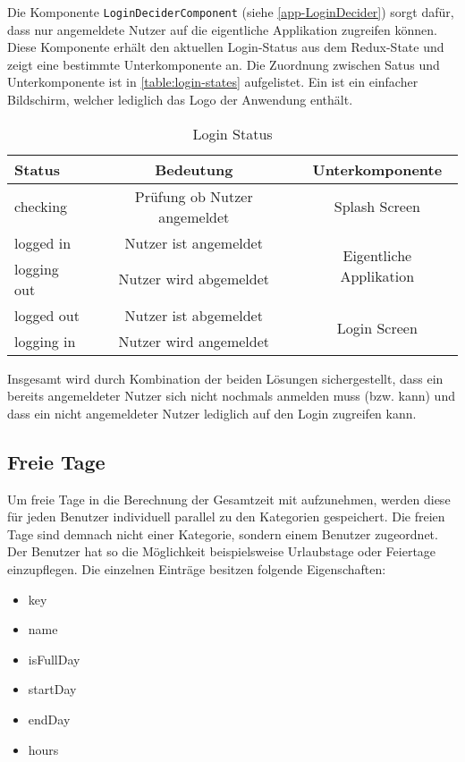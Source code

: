 

Die Komponente \texttt{LoginDeciderComponent} (siehe \autoref{app-LoginDecider}) sorgt dafür,
dass nur angemeldete Nutzer auf die eigentliche Applikation zugreifen können.
Diese Komponente erhält den aktuellen Login-Status aus dem Redux-State und zeigt eine bestimmte Unterkomponente an.
Die Zuordnung zwischen Satus und Unterkomponente ist in \autoref{table:login-states} aufgelistet.
Ein  ist ein einfacher Bildschirm, welcher lediglich das Logo der Anwendung enthält.

\begin{table}[h!]
    \centering
     \begin{tabular}{| l | c | c |}
        \hline
        Status      & Bedeutung                      & Unterkomponente \\
        \hline\hline
        checking    & Prüfung ob Nutzer angemeldet   & Splash Screen\\
        \hline
        logged in   & Nutzer ist angemeldet          & \multirow{2}{*}{Eigentliche Applikation}\\
        \cline{1-2}
        logging out & Nutzer wird abgemeldet         & \\
        \hline
        logged out  & Nutzer ist abgemeldet          & \multirow{2}{*}{Login Screen} \\
        \cline{1-2}
        logging in  & Nutzer wird angemeldet         & \\
        \hline
     \end{tabular}
     \caption{Login Status}
     \label{table:login-states}
\end{table}

Insgesamt wird durch Kombination der beiden Lösungen sichergestellt,
dass ein bereits angemeldeter Nutzer sich nicht nochmals anmelden muss (bzw. kann)
und dass ein nicht angemeldeter Nutzer lediglich auf den Login zugreifen kann.

\subsection{Freie Tage}
Um freie Tage in die Berechnung der Gesamtzeit mit aufzunehmen, werden diese für jeden Benutzer individuell parallel zu
den Kategorien gespeichert. Die freien Tage sind demnach nicht einer Kategorie, sondern einem Benutzer zugeordnet.
Der Benutzer hat so die Möglichkeit beispielsweise Urlaubstage oder Feiertage einzupflegen.
Die einzelnen Einträge besitzen folgende Eigenschaften:
\begin{itemize}
    \item key
    \item name
    \item isFullDay
    \item startDay
    \item endDay
    \item hours
\end{itemize}

